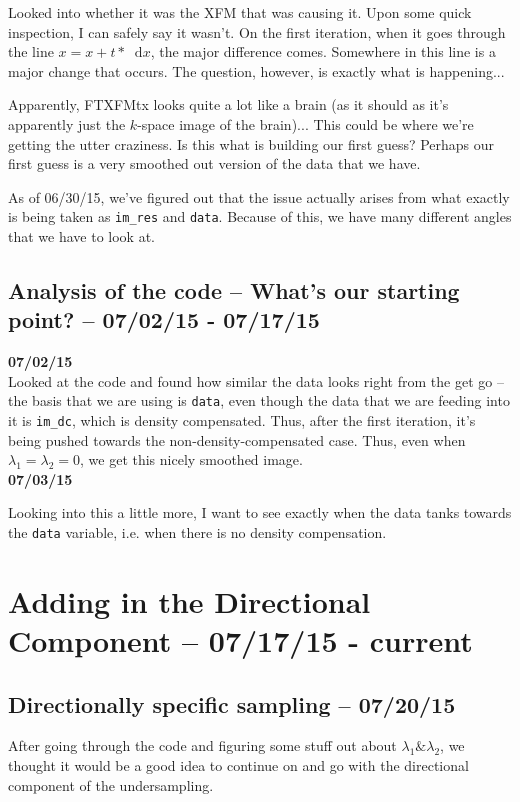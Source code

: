 \documentclass[11 pt]{article}
\newcommand*\diff{\mathop{}\!\mathrm{d}}
\newcommand{\bo}{\noindent\textbf}
\let\oldsection\section
\renewcommand\section{\clearpage\newpage\oldsection}
\begin{document}
    Looked into whether it was the XFM that was causing it. Upon some quick inspection, I can safely say it wasn't. On the first iteration, when it goes through the line $x = x + t*\diff x$, the major difference comes. Somewhere in this line is a major change that occurs. The question, however, is exactly what is happening... 

    Apparently, FTXFMtx looks quite a lot like a brain (as it should as it's apparently just the $k$-space image of the brain)... This could be where we're getting the utter craziness. Is this what is building our first guess? Perhaps our first guess is a very smoothed out version of the data that we have. 

    As of 06/30/15, we've figured out that the issue actually arises from what exactly is being taken as \texttt{im\_res} and \texttt{data}. Because of this, we have many different angles that we have to look at.


  \subsection{Analysis of the code -- What's our starting point? -- 07/02/15 - 07/17/15 }

    \bo{07/02/15}\\

    Looked at the code and found how similar the data looks right from the get go -- the basis that we are using is \texttt{data}, even though the data that we are feeding into it is \texttt{im\_dc}, which is density compensated. Thus, after the first iteration, it's being pushed towards the non-density-compensated case. Thus, even when $\lambda_1 = \lambda_2 = 0$, we get this nicely smoothed image. \\

    \bo{07/03/15}
    
    Looking into this a little more, I want to see exactly when the data tanks towards the \texttt{data} variable, i.e. when there is no density compensation. 
  

\section{Adding in the Directional Component -- 07/17/15 - current}
  
  \subsection{Directionally specific sampling -- 07/20/15}
    After going through the code and figuring some stuff out about $\lambda_1 \& \lambda_2$, we thought it would be a good idea to continue on and go with the directional component of the undersampling.
\end{document}
